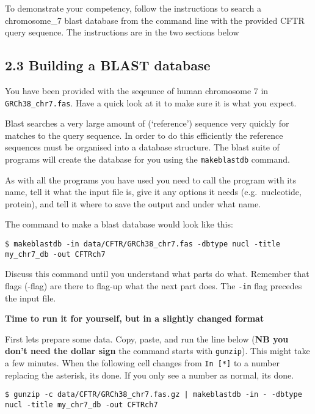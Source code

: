 \documentclass[11pt]{article}
\begin{document}
To demonstrate your competency, follow the instructions to search a
chromosome\_7 blast database from the command line with the provided
CFTR query sequence. The instructions are in the two sections below

    \hypertarget{building-a-blast-database}{%
\subsection{2.3 Building a BLAST
database}\label{building-a-blast-database}}

You have been provided with the seqeunce of human chromosome 7 in
\texttt{GRCh38\_chr7.fas}. Have a quick look at it to make sure it is
what you expect.

    Blast searches a very large amount of (`reference') sequence very
quickly for matches to the query sequence. In order to do this
efficiently the reference sequences must be organised into a database
structure. The blast suite of programs will create the database for you
using the \texttt{makeblastdb} command.

As with all the programs you have used you need to call the program with
its name, tell it what the input file is, give it any options it needs
(e.g.~nucleotide, protein), and tell it where to save the output and
under what name.

The command to make a blast database would look like this:

\begin{verbatim}
$ makeblastdb -in data/CFTR/GRCh38_chr7.fas -dbtype nucl -title my_chr7_db -out CFTRch7
\end{verbatim}

Discuss this command until you understand what parts do what. Remember
that flags (-flag) are there to flag-up what the next part does. The
\texttt{-in} flag precedes the input file.

\textbf{Time to run it for yourself, but in a slightly changed format}

First lets prepare some data. Copy, paste, and run the line below
(\textbf{NB you don't need the dollar sign} the command starts with
\texttt{gunzip}). This might take a few minutes. When the following cell
changes from \texttt{In\ {[}*{]}} to a number replacing the asterisk,
its done. If you only see a number as normal, its done.

\begin{verbatim}
$ gunzip -c data/CFTR/GRCh38_chr7.fas.gz | makeblastdb -in - -dbtype nucl -title my_chr7_db -out CFTRch7
\end{verbatim}
\end{document}
